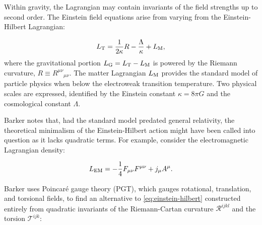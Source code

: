 \documentclass{article}
\begin{document}
Within gravity, the Lagrangian may contain invariants of the field strengths up to second order. The Einstein field equations arise from varying from the Einstein-Hilbert Lagrangian:

\begin{equation}
  \label{eq:einstein-hilbert}
  L_\textrm T = \frac{1}{2\kappa}R - \frac{\Lambda}{\kappa} + L_\textrm M \textrm,
\end{equation}
%
where the gravitational portion $L_\textrm G = L_\textrm T - L_\textrm M$ is powered by the Riemann curvature, $R \equiv {R^{\mu\nu}}_{\mu\nu}$. The matter Lagrangian $L_\textrm M$ provides the standard model of particle physics when below the electroweak transition temperature. Two physical scales are expressed, identified by the Einstein constant $\kappa=8\pi G$ and the cosmological constant $\Lambda$. 

Barker \cite{barker-thesis} notes that, had the standard model predated general relativity, the theoretical minimalism of the Einstein-Hilbert action might have been called into question as it lacks quadratic terms. For example, consider the electromagnetic Lagrangian density:

\begin{equation}
  L_\textrm{EM} = -\frac{1}{4} F_{\mu\nu}F^{\mu\nu} + j_\mu A^\mu \textrm .
\end{equation}

Barker uses Poincar\'e gauge theory (PGT), which gauges rotational, translation, and torsional fields, to find an alternative to \ref{eq:einstein-hilbert} constructed entirely from quadratic invariants of the Riemann-Cartan curvature $\mathcal R^{ijkl}$ and the torsion $\mathcal T^{ijk}$:
\end{document}
